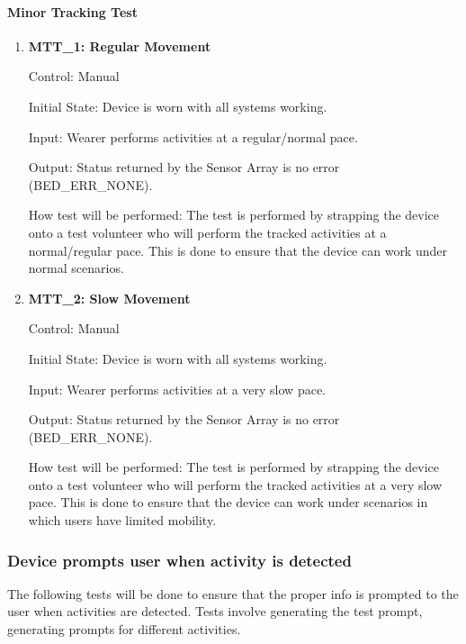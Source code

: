 \documentclass[12pt, titlepage]{article}
\begin{document}
\paragraph{Minor Tracking Test}
\begin{enumerate}
	\item{\textbf{MTT\_1: Regular Movement} \\}\label{MTT1}
	
		Control: Manual 
							
		Initial State: Device is worn with all systems working.
							
		Input: Wearer performs activities at a regular/normal pace.
		
		Output: Status returned by the Sensor Array is no error (BED\_ERR\_NONE).

		How test will be performed: The test is performed by strapping the device onto a test volunteer who will perform the tracked activities at a normal/regular pace. This is done to ensure that the device can 				work under normal scenarios.\\


	\item{\textbf{MTT\_2: Slow Movement} \\}\label{MTT2}
	
		Control: Manual 
							
		Initial State: Device is worn with all systems working.
							
		Input: Wearer performs activities at a very slow pace.
		
		Output: Status returned by the Sensor Array is no error (BED\_ERR\_NONE).
		
		How test will be performed: The test is performed by strapping the device onto a test volunteer who will perform the tracked activities at a very slow pace. This is done to ensure that the device can 					work under scenarios in which users have limited mobility.\\


\end{enumerate}
\subsubsection{Device prompts user when activity is detected}

The following tests will be done to ensure that the proper info is prompted to the user when activities are detected. Tests involve generating the test prompt, generating prompts for different activities.
		
\end{document}
